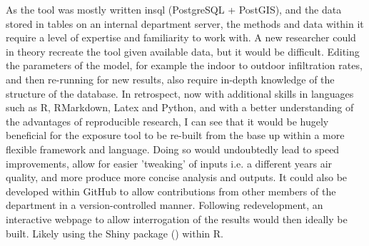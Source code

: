 As the tool was mostly written in\gls{sql} (PostgreSQL + PostGIS), and the data stored in tables on an internal department server, the methods and data within it require a level of expertise and familiarity to work with. A new researcher could in theory recreate the tool given available data, but it would be difficult. Editing the parameters of the model, for example the indoor to outdoor infiltration rates, and then re-running for new results, also require in-depth knowledge of the structure of the database.  In retrospect, now with additional skills in languages such as R, RMarkdown, Latex and Python, and with a better understanding of the advantages of reproducible research, I can see that it would be hugely beneficial for the exposure tool to be re-built from the base up within a more flexible framework and language. Doing so would undoubtedly lead to speed improvements, allow for easier 'tweaking' of inputs i.e. a different years air quality, and more produce more concise analysis and outputs. It could also be developed within GitHub to allow contributions from other members of the department in a version-controlled manner. Following redevelopment, an interactive webpage to allow interrogation of the results would then ideally be built. Likely using the Shiny package (\cite{shiny2018}) within R.